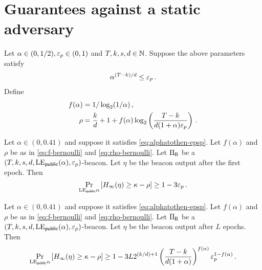 \section{Guarantees against a static adversary}

Let $\alpha \in (0, 1/2), \mathsf{\varepsilon}_p \in (0, 1)$ and $T, k, s, d \in \mathbb{N}$.
Suppose the above parameters satisfy 
\begin{align}\label{eq:alphatothen-epsp}
  \alpha^{(T-k)/d} \leq \mathsf{\varepsilon}_p
  \,.
\end{align}
Define 
\begin{align}
  f(\alpha)&= 1/\log_2(1/\alpha)\,, \label{eq:f-bernoulli} \\
  \rho &= \frac{k}{d} + 1 + f(\alpha) \log_2 \left(\frac{T-k}{d (1+\alpha) \mathsf{\varepsilon}_p } \right)
  \,. \label{eq:rho-bernoulli}
\end{align}

\begin{theorem}\label{thm:beacon-bernoulli-single-epoch}
  Let $\alpha \in (0, 0.41)$ and suppose it satisfies \eqref{eq:alphatothen-epsp}.
  Let $f(\alpha)$ and $\rho$ be as in \eqref{eq:f-bernoulli} and \eqref{eq:rho-bernoulli}.
  Let $\Pi_{\mathsf{B}}$ be a $(T,k,s,d,\mathrm{LE}_\mathsf{public}(\alpha), \mathsf{\varepsilon}_p)$-beacon.
  Let $\eta$ be the beacon output after the first epoch. 
  Then 
  \begin{equation}\label{eq:security-bernoulli-single-epoch}
    \Pr_{\mathrm{LE}_\mathsf{public}{\alpha}}\left[H_\infty(\eta) \geq \kappa - \rho \right] \geq 1 - 3 \mathsf{\varepsilon}_p
    \,.
  \end{equation}
\end{theorem}

\begin{theorem}\label{thm:beacon-bernoulli-multi-epoch}
  Let $\alpha \in (0, 0.41)$ and suppose it satisfies \eqref{eq:alphatothen-epsp}.
  Let $f(\alpha)$ and $\rho$ be as in \eqref{eq:f-bernoulli} and \eqref{eq:rho-bernoulli}.
  Let $\Pi_{\mathsf{B}}$ be a $(T,k,s,d,\mathrm{LE}_\mathsf{public}(\alpha), \mathsf{\varepsilon}_p)$-beacon.
  Let $\eta$ be the beacon output after $L$ epochs. 
  Then 
  \begin{equation}\label{eq:security-bernoulli-multi-epoch}
    \Pr_{\mathrm{LE}_\mathsf{public}{\alpha}}\left[H_\infty(\eta) \geq \kappa - \rho \right] 
      \geq 1 - 3 L
        2^{(k/d) + 1}
        \left( \frac{T-k}{d(1+\alpha)}\right)^{f(\alpha)}
        \mathsf{\varepsilon}_p^{1-f(\alpha)}
    \,.
  \end{equation}
\end{theorem}




